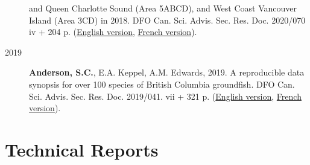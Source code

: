 \begin{description}
and Queen Charlotte Sound (Area 5ABCD), and West Coast Vancouver Island
(Area 3CD) in 2018. DFO Can. Sci. Advis. Sec. Res. Doc. 2020/070 iv +
204 p.
(\href{https://www.dfo-mpo.gc.ca/csas-sccs/Publications/ResDocs-DocRech/2020/2020_070-eng.html}{English
version},
\href{https://www.dfo-mpo.gc.ca/csas-sccs/Publications/ResDocs-DocRech/2020/2020_070-fra.html}{French
version}).
\item[2019]
\textbf{Anderson, S.C.}, E.A. Keppel, A.M. Edwards, 2019. A reproducible
data synopsis for over 100 species of British Columbia groundfish. DFO
Can. Sci. Advis. Sec. Res. Doc. 2019/041. vii + 321 p.
(\href{http://www.dfo-mpo.gc.ca/csas-sccs/Publications/ResDocs-DocRech/2019/2019_041-eng.html}{English
version},
\href{http://www.dfo-mpo.gc.ca/csas-sccs/Publications/ResDocs-DocRech/2019/2019_041-fra.html}{French
version}).
\end{description}

\hypertarget{technical-reports}{%
\section{Technical Reports}\label{technical-reports}}

